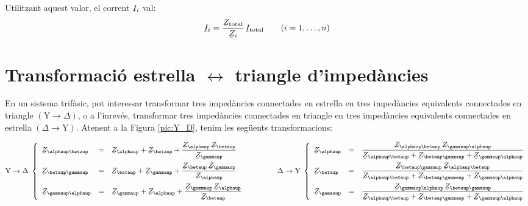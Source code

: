 Utilitzant aquest valor, el corrent $\cmplx{I}_i$ val:
\begin{equation}
    \cmplx{I}_i = \frac{\cmplx{Z}\ped{total}}{\cmplx{Z}_i}\,\cmplx{I}\ped{total} \qquad (i=1,\dots,n)\label{eq:div_corrent}
\end{equation}




\section{\texorpdfstring{Transformaci\'{o} estrella $\boldsymbol{\leftrightarrow}$ triangle d'imped\`{a}ncies}
    {Transformaci\'{o} estrella-triangle d'imped\`{a}ncies}}\label{secc:d_y} 

En un sistema trif\`{a}sic, pot interessar transformar tres imped\`{a}ncies connectades en
estrella en tres imped\`{a}ncies equivalents connectades en triangle
$(\text{Y}\rightarrow\Delta)$, o a l'inrev\'{e}s, transformar tres imped\`{a}ncies connectades en
triangle en tres imped\`{a}ncies equivalents connectades en estrella
$(\Delta\rightarrow\text{Y})$. Atenent a la Figura \vref{pic:Y_D}, tenim les seg\"{u}ents
transformacions:

\begin{equation}\label{eq:Y_D}
   \text{Y}\rightarrow\Delta\;\left\{
   \begin{array}{lll}
      \cmplx{Z}_{\alphaup\betaup} &= &\displaystyle \cmplx{Z}_{\alphaup} + \cmplx{Z}_{\betaup} + \frac{\cmplx{Z}_{\alphaup}\,\cmplx{Z}_{\betaup}}{\cmplx{Z}_{\gammaup}}  \\[2.5ex]
      \cmplx{Z}_{\betaup\gammaup} &= &\displaystyle \cmplx{Z}_{\betaup} + \cmplx{Z}_{\gammaup} + \frac{\cmplx{Z}_{\betaup}\,\cmplx{Z}_{\gammaup}}{\cmplx{Z}_{\alphaup}}  \\[2.5ex]
      \cmplx{Z}_{\gammaup\alphaup} &= &\displaystyle \cmplx{Z}_{\gammaup} + \cmplx{Z}_{\alphaup} + \frac{\cmplx{Z}_{\gammaup}\, \cmplx{Z}_{\alphaup}}{\cmplx{Z}_{\betaup}}
   \end{array}
   \right.
   \qquad\qquad
   \Delta\rightarrow\text{Y}\;\left\{
   \begin{array}{lll}
      \cmplx{Z}_{\alphaup} &= &\dfrac{\cmplx{Z}_{\alphaup\betaup}\, \cmplx{Z}_{\gammaup\alphaup}}{  \cmplx{Z}_{\alphaup\betaup} + \cmplx{Z}_{\betaup\gammaup}+ \cmplx{Z}_{\gammaup\alphaup}}  \\[2.5ex]
      \cmplx{Z}_{\betaup} &= &\dfrac{\cmplx{Z}_{\betaup\gammaup}\, \cmplx{Z}_{\alphaup\betaup}}{  \cmplx{Z}_{\alphaup\betaup} + \cmplx{Z}_{\betaup\gammaup}+ \cmplx{Z}_{\gammaup\alphaup}}  \\[2.5ex]
      \cmplx{Z}_{\gammaup} &= &\dfrac{\cmplx{Z}_{\gammaup\alphaup}\, \cmplx{Z}_{\betaup\gammaup}}{  \cmplx{Z}_{\alphaup\betaup} + \cmplx{Z}_{\betaup\gammaup}+ \cmplx{Z}_{\gammaup\alphaup}}
   \end{array}
   \right.
\end{equation}

